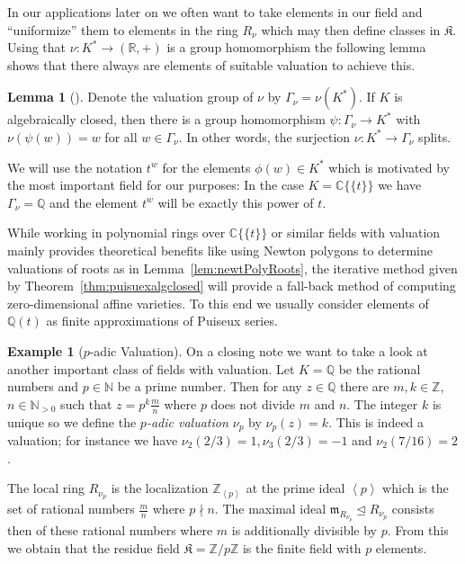 \documentclass[
  paper=a4,
  titlepage,
  bibliography=totoc,
  listof=totoc,
  pagesize=pdftex
]{scrartcl}
\numberwithin{figure}{section}
\numberwithin{equation}{section}
\numberwithin{table}{section}
\newcommand*\setZ{\mathds{Z}}
\newcommand*\setR{\mathds{R}}
\newcommand*\setC{\mathds{C}}
\newcommand*\setQ{\mathds{Q}}
\newcommand*\setN{\mathds{N}}
\newcommand*\ideal[1]{\left\langle #1 \right\rangle}
\newcommand*\puiseux[2]{#1\{\!\{#2\}\!\}}
\newcommand*\CCt{\puiseux{\setC}{t}}
\let\idealof\trianglelefteq
\theoremstyle{definition}
\newtheorem{example}[definition]{Example}
\newtheorem{lemma}[definition]{Lemma}
\numberwithin{definition}{section}
\begin{document}
In our applications later on we often want to take elements in our field and
\enquote{uniformize} them to elements in the ring $R_{\nu}$ which may then define classes
in $\mathfrak K$. Using that $\nu : K^* \to (\setR, +)$ is a group homomorphism the
following lemma shows that there always are elements of suitable valuation to achieve
this.

\begin{lemma}[{\cite[Lemma~2.1.15]{sturmMacTrop}}]
  \label{lem:valSplit}
  Denote the valuation group of $\nu$ by $\Gamma_\nu = \nu(K^*)$. If $K$ is algebraically
  closed, then there is a group homomorphism $\psi : \Gamma_\nu \to K^*$ with
  $\nu(\psi(w)) = w$ for all $w \in \Gamma_\nu$. In other words, the surjection $\nu : K^*
  \to \Gamma_\nu$ splits.
\end{lemma}

We will use the notation $t^w$ for the elements $\phi(w) \in K^*$ which is motivated by
the most important field for our purposes: In the case $K = \CCt$ we have $\Gamma_\nu =
\setQ$ and the element $t^w$ will be exactly this power of $t$.

While working in polynomial rings over $\CCt$ or similar fields with valuation mainly
provides theoretical benefits like using Newton polygons to determine valuations of roots
as in Lemma~\ref{lem:newtPolyRoots}, the iterative method given by
Theorem~\ref{thm:puisuexalgclosed} will provide a fall-back method of computing
zero-dimensional affine varieties. To this end we usually consider elements of $\setQ(t)$
as finite approximations of Puiseux series.

\begin{example}[$p$-adic Valuation] \label{ex:pAdic}
  On a closing note we want to take a look at another important class of fields with
  valuation. Let $K = \setQ$ be the rational numbers and $p\in \setN$ be a prime number.
  Then for any $z \in \setQ$ there are $m, k \in \setZ$, $n \in \setN_{>0}$ such that $z =
  p^k \frac mn$ where $p$ does not divide $m$ and $n$. The integer $k$ is unique so we
  define the \emph{$p$-adic valuation $\nu_p$} by $\nu_p(z) = k$. This is indeed a
  valuation; for instance we have $\nu_2(2/3) = 1, \nu_3(2/3)=-1$ and $\nu_2(7/16)=2$.

  The local ring $R_{\nu_p}$ is the localization $\setZ_{\ideal p}$ at the prime ideal
  $\ideal p$ which is the set of rational numbers $\frac mn$ where $p \nmid n$. The
  maximal ideal $\mathfrak m_{R_{\nu_p}} \idealof R_{\nu_p}$ consists then of these
  rational numbers where $m$ is additionally divisible by $p$. From this we obtain that
  the residue field $\mathfrak K = \setZ/p\setZ$ is the finite field with $p$ elements.
\end{example}
\end{document}
